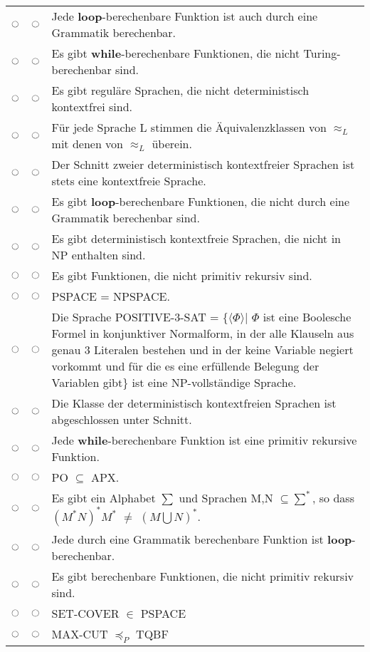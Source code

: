 \documentclass[a4paper,12pt]{article}
\begin{document}
\begin{tabular}{ccp{}}
		$\ocircle$ & $\ocircle$ & Jede \textbf{loop}-berechenbare Funktion ist auch durch eine Grammatik berechenbar.\\
		$\ocircle$ & $\ocircle$ & Es gibt \textbf{while}-berechenbare Funktionen, die nicht Turing-berechenbar sind.\\
		$\ocircle$ & $\ocircle$ & Es gibt regul\"are Sprachen, die nicht deterministisch kontextfrei sind.\\
		$\ocircle$ & $\ocircle$ & F\"ur jede Sprache L stimmen die \"Aquivalenzklassen von $\approx_L$ mit denen von $\approx_L$ \"uberein.\\
		$\ocircle$ & $\ocircle$ & Der Schnitt zweier deterministisch kontextfreier Sprachen ist stets eine kontextfreie Sprache.\\
		$\ocircle$ & $\ocircle$ & Es gibt \textbf{loop}-berechenbare Funktionen, die nicht durch eine Grammatik berechenbar sind.\\
		$\ocircle$ & $\ocircle$ & Es gibt deterministisch kontextfreie Sprachen, die nicht in NP enthalten sind.\\
		$\ocircle$ & $\ocircle$ & Es gibt Funktionen, die nicht primitiv rekursiv sind.\\
		$\ocircle$ & $\ocircle$ & PSPACE = NPSPACE.\\
		$\ocircle$ & $\ocircle$ & Die Sprache POSITIVE-3-SAT = \{$\langle\Phi\rangle$| $\Phi$ ist eine Boolesche Formel in konjunktiver Normalform, in der alle Klauseln aus genau 3 Literalen bestehen und in der keine Variable negiert vorkommt und f\"ur die es eine erf\"ullende Belegung der Variablen gibt\} ist eine NP-vollst\"andige Sprache.\\
		$\ocircle$ & $\ocircle$ & Die Klasse der deterministisch kontextfreien Sprachen ist abgeschlossen unter Schnitt.\\
		$\ocircle$ & $\ocircle$ & Jede \textbf{while}-berechenbare Funktion ist eine primitiv rekursive Funktion.\\
		$\ocircle$ & $\ocircle$ & PO $\subseteq$ APX.\\
		$\ocircle$ & $\ocircle$ & Es gibt ein Alphabet $\sum$ und Sprachen M,N $\subseteq \sum^*$, so dass $(M^*N)^*M^*$ $\not=$ $(M \bigcup N)^*$.\\
		$\ocircle$ & $\ocircle$ & Jede durch eine Grammatik berechenbare Funktion ist \textbf{loop}-berechenbar.\\
		$\ocircle$ & $\ocircle$ & Es gibt berechenbare Funktionen, die nicht primitiv rekursiv sind.\\
		$\ocircle$ & $\ocircle$ & SET-COVER $\in$ PSPACE\\
		$\ocircle$ & $\ocircle$ & MAX-CUT $\preceq_P$ TQBF\\
		
	\end{tabular}
\end{document}
